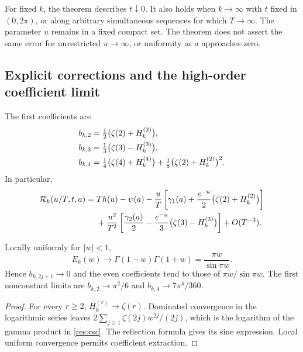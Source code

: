 \begin{remark}
For fixed $k$, the theorem describes $t\downarrow0$. It also holds when
$k\to\infty$ with $t$ fixed in $(0,2\pi)$, or along arbitrary simultaneous
sequences for which $T\to\infty$. The parameter $u$ remains in a fixed
compact set. The theorem does not assert the same error for unrestricted
$u\to\infty$, or uniformity as $a$ approaches zero.
\end{remark}

\subsection{Explicit corrections and the high-order coefficient limit}
The first coefficients are
\begin{align}
 b_{k,2}&=\tfrac12\bigl(\zeta(2)+H_k^{(2)}\bigr),\notag\\
 b_{k,3}&=\tfrac13\bigl(\zeta(3)-H_k^{(3)}\bigr),\label{res:firstb}\\
 b_{k,4}&=\tfrac14\bigl(\zeta(4)+H_k^{(4)}\bigr)
          +\tfrac18\bigl(\zeta(2)+H_k^{(2)}\bigr)^2.\notag
\end{align}
In particular,
\begin{align}
 \mathcal R_k(u/T,t,a)
  ={}&T h(u)-\psi(a)
 -\frac uT\left[\gamma_1(a)
        +\frac{e^{-u}}2\bigl(\zeta(2)+H_k^{(2)}\bigr)\right]\notag\\
 &+\frac{u^2}{T^2}\left[\frac{\gamma_2(a)}2
       -\frac{e^{-u}}3\bigl(\zeta(3)-H_k^{(3)}\bigr)\right]
       +O(T^{-3}).\label{res:explicit}
\end{align}

\begin{proposition}\label{res:highorder}
Locally uniformly for $|w|<1$,
\begin{equation}\label{res:csc}
 E_k(w)\longrightarrow \Gamma(1-w)\Gamma(1+w)
             =\frac{\pi w}{\sin\pi w}.
\end{equation}
Hence $b_{k,2j+1}\to0$ and the even coefficients tend to those of
$\pi w/\sin\pi w$. The first nonconstant limits are
$b_{k,2}\to\pi^2/6$ and $b_{k,4}\to7\pi^4/360$.
\end{proposition}
\begin{proof}
For every $r\geq2$, $H_k^{(r)}\to\zeta(r)$. Dominated convergence in the
logarithmic series leaves $2\sum_{j\geq1}\zeta(2j)w^{2j}/(2j)$, which is
the logarithm of the gamma product in \eqref{res:csc}. The reflection
formula gives its sine expression. Local uniform convergence permits
coefficient extraction.
\end{proof}

